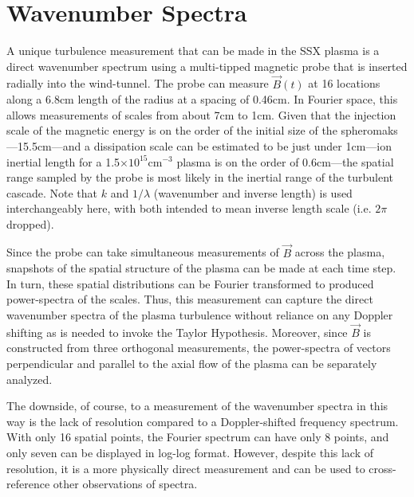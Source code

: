 \documentclass[aip,prl,amsmath,amssymb,reprint,superscriptaddress]{revtex4-1} %
\begin{document}
\section{Wavenumber Spectra}\label{sec:wavenumber}

A unique turbulence measurement that can be made in the SSX plasma is a direct wavenumber spectrum using a multi-tipped magnetic probe that is inserted radially into the wind-tunnel. The probe can measure $\vec{B}(t)$ at 16 locations along a 6.8cm length of the radius at a spacing of 0.46cm. In Fourier space, this allows measurements of scales from about 7cm to 1cm. Given that the injection scale of the magnetic energy is on the order of the initial size of the spheromaks---15.5cm---and a dissipation scale can be estimated to be just under 1cm---ion inertial length for a 1.5$\times 10^{15}$cm$^{-3}$ plasma is on the order of 0.6cm---the spatial range sampled by the probe is most likely in the inertial range of the turbulent cascade. Note that $k$ and $1/\lambda$ (wavenumber and inverse length) is used interchangeably here, with both intended to mean inverse length scale (i.e. $2\pi$ dropped).

Since the probe can take simultaneous measurements of $\vec{B}$ across the plasma, snapshots of the spatial structure of the plasma can be made at each time step. In turn, these spatial distributions can be Fourier transformed to produced power-spectra of the scales. Thus, this measurement can capture the direct wavenumber spectra of the plasma turbulence without reliance on any Doppler shifting as is needed to invoke the Taylor Hypothesis. Moreover, since $\vec{B}$ is constructed from three orthogonal measurements, the power-spectra of vectors perpendicular and parallel to the axial flow of the plasma can be separately analyzed. 

The downside, of course, to a measurement of the wavenumber spectra in this way is the lack of resolution compared to a Doppler-shifted frequency spectrum. With only 16 spatial points, the Fourier spectrum can have only 8 points, and only seven can be displayed in log-log format. However, despite this lack of resolution, it is a more physically direct measurement and can be used to cross-reference other observations of spectra.
\end{document}
